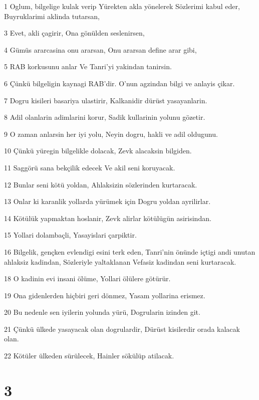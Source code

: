 \par 1 Oglum, bilgelige kulak verip Yürekten akla yönelerek Sözlerimi kabul eder, Buyruklarimi aklinda tutarsan,
\par 3 Evet, akli çagirir, Ona gönülden seslenirsen,
\par 4 Gümüs ararcasina onu ararsan, Onu ararsan define arar gibi,
\par 5 RAB korkusunu anlar Ve Tanri'yi yakindan tanirsin.
\par 6 Çünkü bilgeligin kaynagi RAB'dir. O'nun agzindan bilgi ve anlayis çikar.
\par 7 Dogru kisileri basariya ulastirir, Kalkanidir dürüst yasayanlarin.
\par 8 Adil olanlarin adimlarini korur, Sadik kullarinin yolunu gözetir.
\par 9 O zaman anlarsin her iyi yolu, Neyin dogru, hakli ve adil oldugunu.
\par 10 Çünkü yüregin bilgelikle dolacak, Zevk alacaksin bilgiden.
\par 11 Saggörü sana bekçilik edecek Ve akil seni koruyacak.
\par 12 Bunlar seni kötü yoldan, Ahlaksizin sözlerinden kurtaracak.
\par 13 Onlar ki karanlik yollarda yürümek için Dogru yoldan ayrilirlar.
\par 14 Kötülük yapmaktan hoslanir, Zevk alirlar kötülügün asirisindan.
\par 15 Yollari dolambaçli, Yasayislari çarpiktir.
\par 16 Bilgelik, gençken evlendigi esini terk eden, Tanri'nin önünde içtigi andi unutan ahlaksiz kadindan, Sözleriyle yaltaklanan Vefasiz kadindan seni kurtaracak.
\par 18 O kadinin evi insani ölüme, Yollari ölülere götürür.
\par 19 Ona gidenlerden hiçbiri geri dönmez, Yasam yollarina erismez.
\par 20 Bu nedenle sen iyilerin yolunda yürü, Dogrularin izinden git.
\par 21 Çünkü ülkede yasayacak olan dogrulardir, Dürüst kisilerdir orada kalacak olan.
\par 22 Kötüler ülkeden sürülecek, Hainler sökülüp atilacak.

\chapter{3}

